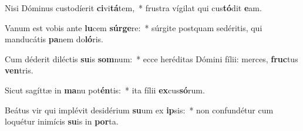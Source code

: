 \item Nisi Dóminus custodíerit \textbf{ci}vi\textbf{tá}tem,~* frustra vígilat qui cus\textbf{tó}dit \textbf{e}am.
\item Vanum est vobis ante \textbf{lu}cem \textbf{súr}\textbf{ge}re:~* súrgite postquam sedéritis, qui manducátis \textbf{pa}nem do\textbf{ló}ris.
\item Cum déderit diléctis \textbf{su}is \textbf{som}num:~* ecce heréditas Dómini fílii: merces, \textbf{fruc}tus \textbf{ven}tris.
\item Sicut sagíttæ in \textbf{ma}nu pot\textbf{én}tis:~* ita fílii \textbf{ex}cus\textbf{só}rum.
\item Beátus vir qui implévit desidérium \textbf{su}um ex \textbf{ip}sis:~* non confundétur cum loquétur inimícis \textbf{su}is in \textbf{por}ta.
